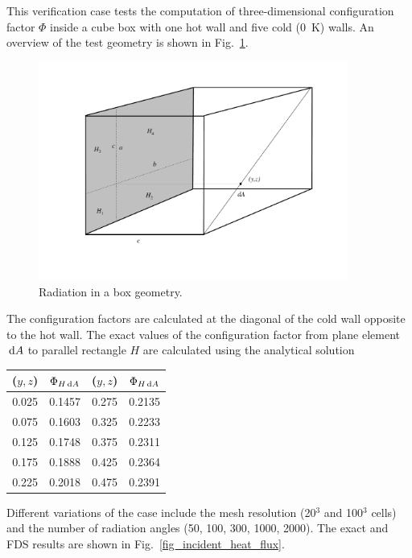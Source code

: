 \documentclass[11pt]{book}
\begin{document}
This verification case tests the computation of three-dimensional configuration factor $\Phi$ inside a cube box with one hot wall and five cold (0~K) walls. An overview of the test geometry is shown in Fig.~\ref{fig_box_radiation}.
\begin{figure}[ht]
\centering
\includegraphics[width=4.0in]{FIGURES/box}
\caption{\label{fig_box_radiation} Radiation in a box geometry.}
\end{figure}
The configuration factors are calculated at the diagonal of the cold wall opposite to the hot wall. The exact values of the configuration factor from plane element $\,\mathrm{d} A$ to parallel rectangle $H$ are calculated using the analytical solution~\cite{Siegel:1}
\begin{center}
\begin{tabular}{|c|c|c|c|}
\hline ($y,z$) & $\Phi_{H \,\mathrm{d} A}$ & ($y,z$) & $\Phi_{H \,\mathrm{d} A}$ \\ \hline \hline
0.025   &0.1457 & 0.275 &0.2135 \\
0.075   &0.1603 & 0.325 &0.2233 \\
0.125   &0.1748 & 0.375 &0.2311 \\
0.175   &0.1888 & 0.425 &0.2364 \\
0.225   &0.2018 & 0.475 &0.2391 \\ \hline
\end{tabular}
\end{center}
Different variations of the case include the mesh resolution (20$^3$ and 100$^3$ cells) and the number of radiation angles (50, 100, 300, 1000, 2000). The exact and FDS results are shown in Fig.~\ref{fig_incident_heat_flux}.
\end{document}

